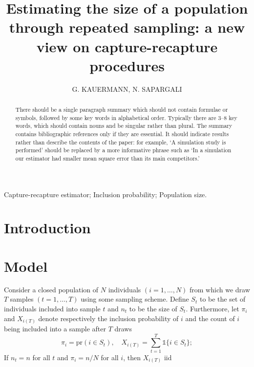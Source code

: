 \documentclass[manuscript]{biometrika}
\begin{document}



\title{Estimating the size of a population through repeated sampling: a new view on capture-recapture procedures}

\author{G. KAUERMANN, N. SAPARGALI}

\maketitle

\begin{abstract}
There should be a single paragraph summary which should not contain formulae or symbols, followed by some key words in alphabetical order.  Typically there are 3--8 key words, which should contain nouns and be singular rather than plural.  The summary contains bibliographic references only if they are essential.  It should indicate results rather than describe the contents of the paper: for example, `A simulation study is performed' should be replaced by a more informative phrase such as `In a simulation our estimator had smaller mean square error than its main competitors.'
\end{abstract}

\begin{keywords}
Capture-recapture estimator; Inclusion probability; Population size.
\end{keywords}

\section{Introduction}

\section{Model}
Consider a closed population of $N$ individuals $(i = 1,\ldots, N)$ from which we draw $T$ samples $(t = 1,\ldots, T)$ using some sampling scheme. Define $S_t$ to be the set of individuals included into sample $t$ and $n_t$ to be the size of $S_t$. Furthermore, let $\pi_i$ and $X_{i(T)}$ denote respectively the inclusion probability of $i$ and the count of $i$ being included into a sample after $T$ draws
\begin{equation*}
\pi_i = \text{pr}(i \in S_t), \quad X_{i(T)} = \sum_{t=1}^T \mathds{1}\{i \in S_t\};
\end{equation*}
If $n_t = n$ for all $t$ and $\pi_i = n / N$ for all $i$, then $X_{i(T)}$ iid 
\end{document}
